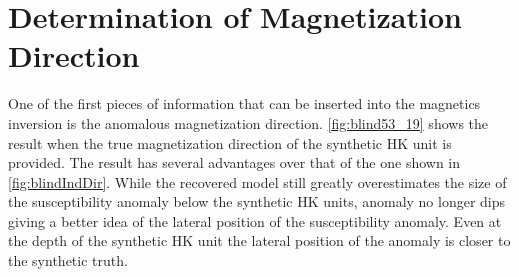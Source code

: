 \FloatBarrier

\section{Determination of Magnetization Direction}
\label{sec:Determination of Magnetization Direction}

One of the first pieces of information that can be inserted into the magnetics inversion is the anomalous magnetization direction. \autoref{fig:blind53_19} shows the result when the true magnetization direction of the synthetic HK unit is provided. The result has several advantages over that of the one shown in \autoref{fig:blindIndDir}. While the recovered model still greatly overestimates the size of the susceptibility anomaly below the synthetic HK units, anomaly no longer dips giving a better idea of the lateral position of the susceptibility anomaly. Even at the depth of the synthetic HK unit the lateral position of the anomaly is closer to the synthetic truth.


